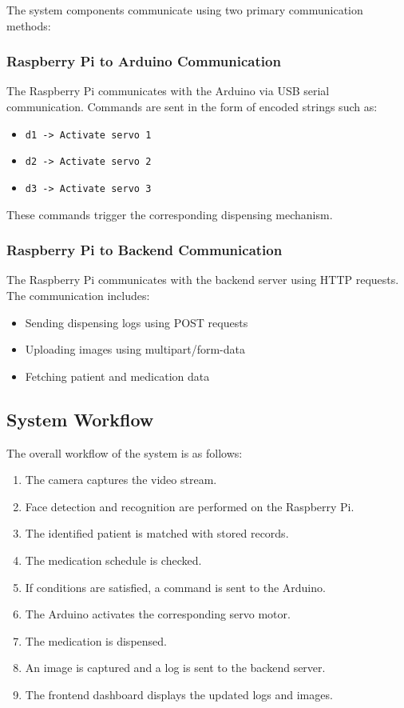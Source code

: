 The system components communicate using two primary communication methods:

\subsubsection{Raspberry Pi to Arduino Communication}

The Raspberry Pi communicates with the Arduino via USB serial communication. Commands are sent in the form of encoded strings such as:

\begin{itemize}
\item \texttt{d1 -> Activate servo 1}
\item \texttt{d2 -> Activate servo 2}
\item \texttt{d3 -> Activate servo 3}
\end{itemize}

These commands trigger the corresponding dispensing mechanism.

\subsubsection{Raspberry Pi to Backend Communication}

The Raspberry Pi communicates with the backend server using HTTP requests. The communication includes:

\begin{itemize}
    \item Sending dispensing logs using POST requests
    \item Uploading images using multipart/form-data
    \item Fetching patient and medication data
\end{itemize}

\subsection{System Workflow}

The overall workflow of the system is as follows:

\begin{enumerate}
    \item The camera captures the video stream.
    \item Face detection and recognition are performed on the Raspberry Pi.
    \item The identified patient is matched with stored records.
    \item The medication schedule is checked.
    \item If conditions are satisfied, a command is sent to the Arduino.
    \item The Arduino activates the corresponding servo motor.
    \item The medication is dispensed.
    \item An image is captured and a log is sent to the backend server.
    \item The frontend dashboard displays the updated logs and images.
\end{enumerate}

